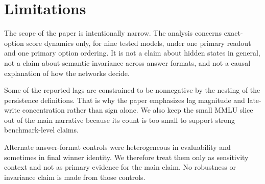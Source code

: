 \section{Limitations}

The scope of the paper is intentionally narrow. The analysis concerns exact-option score dynamics only, for nine tested models, under one primary readout and one primary option ordering. It is not a claim about hidden states in general, not a claim about semantic invariance across answer formats, and not a causal explanation of how the networks decide.

Some of the reported lags are constrained to be nonnegative by the nesting of the persistence definitions. That is why the paper emphasizes lag magnitude and late-write concentration rather than sign alone. We also keep the small MMLU slice out of the main narrative because its count is too small to support strong benchmark-level claims.

Alternate answer-format controls were heterogeneous in evaluability and sometimes in final winner identity. We therefore treat them only as sensitivity context and not as primary evidence for the main claim. No robustness or invariance claim is made from those controls.
